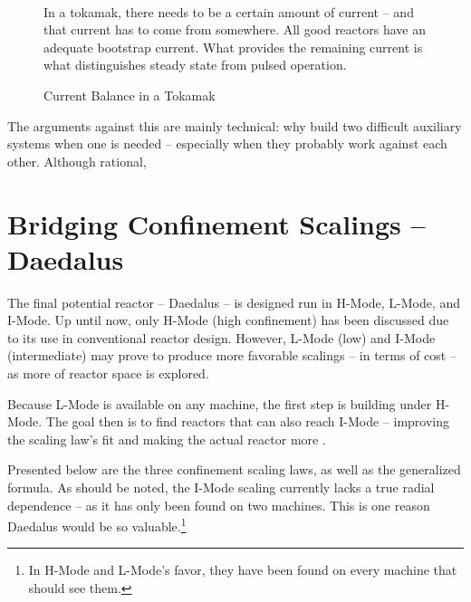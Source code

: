 \begin{figure}
	\centering
	\begin{adjustbox}{width=0.75\textwidth}
		
	\end{adjustbox}
	\caption{Current Balance in a Tokamak} ~\\
	\small In a tokamak, there needs to be a certain amount of current -- and that current has to come from somewhere. All good reactors have an adequate bootstrap current. What provides the remaining current is what distinguishes steady state from pulsed operation.
	\label{fig:cur_balance_final}
\end{figure}

The arguments against this are mainly technical: why build two difficult auxiliary systems when one is needed -- especially when they probably work against each other. Although rational, 

\section{Bridging Confinement Scalings -- Daedalus}

The final potential reactor -- Daedalus -- is designed  run in H-Mode, L-Mode, and I-Mode. Up until now, only H-Mode (high confinement) has been discussed due to its use in conventional reactor design. However, L-Mode (low) and I-Mode\cite{imode} (intermediate) may prove to produce more favorable scalings -- in terms of cost -- as more of reactor space is explored.

Because L-Mode is available on any machine, the first step is  building under H-Mode. The goal then is to find reactors that can also reach I-Mode --  improving the scaling law's fit and  making the actual reactor more .

Presented below are the three confinement scaling laws, as well as the generalized formula. As should be noted, the I-Mode scaling currently lacks a true radial dependence -- as it has only been found on two machines.\cite{imode} This is one reason Daedalus would be so valuable.\footnote{ In H-Mode and L-Mode's favor, they have been found on every machine that should see them. }

